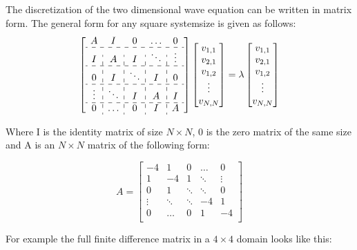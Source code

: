 \documentclass[a4paper]{article}
\begin{document}
The discretization of the two dimensional wave equation can be written in matrix form. The general form for any square systemsize is given as follows:
\begin{equation}
\left[
\begin{array}{c:c:c:c:c}
    A       &I    & 0     & \dots & 0 \\
    \hdashline
    I      &A     &I     & \ddots     & \vdots \\
    \hdashline
    0       &I     &\ddots & I & 0\\
    \hdashline
    \vdots  &\ddots &I & A    & I \\
    \hdashline
    0       &\dots  &0      & I    & A \\
\end{array}
\right ]
\begin{bmatrix*}
    v_{1,1}\\
    v_{2,1}\\
    v_{1,2}\\
    \vdots\\
    v_{N,N}
\end{bmatrix*}
=
\lambda
\begin{bmatrix*}
    v_{1,1}\\
    v_{2,1}\\
    v_{1,2}\\
    \vdots\\
    v_{N,N}
\end{bmatrix*}
\label{eq:genMatExp}
\end{equation}

Where I is the identity matrix of size $N \times N$, 0 is the zero matrix of the same size and A is an $N \times N$ matrix of the following form:

\begin{equation}
A = 
\left[
\begin{array}{rrrrr}
    -4       &1     & 0     & \dots & 0 \\
    1      &-4      &1     & \ddots     & \vdots \\
    0       &1     &\ddots &\ddots& 0\\
    \vdots  &\ddots &\ddots & -4    & 1 \\
    0       &\dots  &0      & 1    & -4 \\
\end{array}
\right]
\label{eq:matA}
\end{equation}

For example the full finite difference matrix in a $4 \times 4$ domain looks like this:
\end{document}
